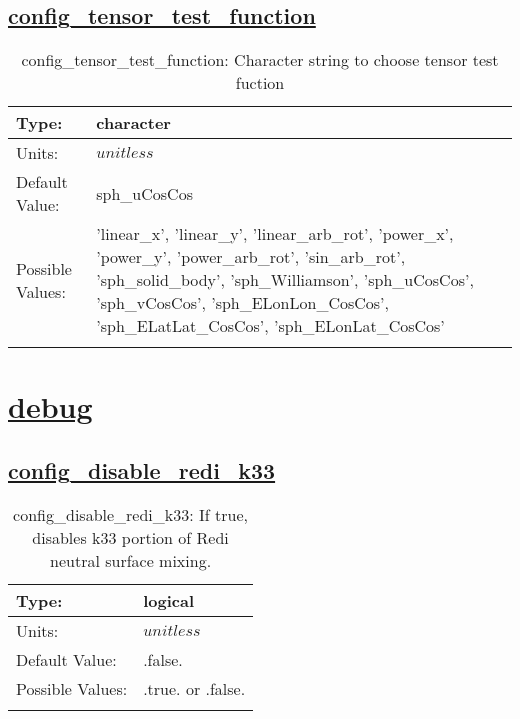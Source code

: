 \subsection[config\_tensor\_test\_function]{\hyperref[sec:nm_tab_testing]{config\_tensor\_test\_function}}
\label{subsec:nm_sec_config_tensor_test_function}
\begin{center}
\begin{longtable}{| p{2.0in} || p{4.0in} |}
    \hline
    Type: & character \\
    \hline
    Units: & $unitless$ \\
    \hline
    Default Value: & sph\_uCosCos \\
    \hline
    Possible Values: & 'linear\_x', 'linear\_y', 'linear\_arb\_rot', 'power\_x', 'power\_y', 'power\_arb\_rot', 'sin\_arb\_rot', 'sph\_solid\_body', 'sph\_Williamson', 'sph\_uCosCos', 'sph\_vCosCos', 'sph\_ELonLon\_CosCos', 'sph\_ELatLat\_CosCos', 'sph\_ELonLat\_CosCos' \\
    \hline
    \caption{config\_tensor\_test\_function: Character string to choose tensor test fuction}
\end{longtable}
\end{center}
\section[debug]{\hyperref[sec:nm_tab_debug]{debug}}
\label{sec:nm_sec_debug}
\subsection[config\_disable\_redi\_k33]{\hyperref[sec:nm_tab_debug]{config\_disable\_redi\_k33}}
\label{subsec:nm_sec_config_disable_redi_k33}
\begin{center}
\begin{longtable}{| p{2.0in} || p{4.0in} |}
    \hline
    Type: & logical \\
    \hline
    Units: & $unitless$ \\
    \hline
    Default Value: & .false. \\
    \hline
    Possible Values: & .true. or .false. \\
    \hline
    \caption{config\_disable\_redi\_k33: If true, disables k33 portion of Redi neutral surface mixing.}
\end{longtable}
\end{center}
